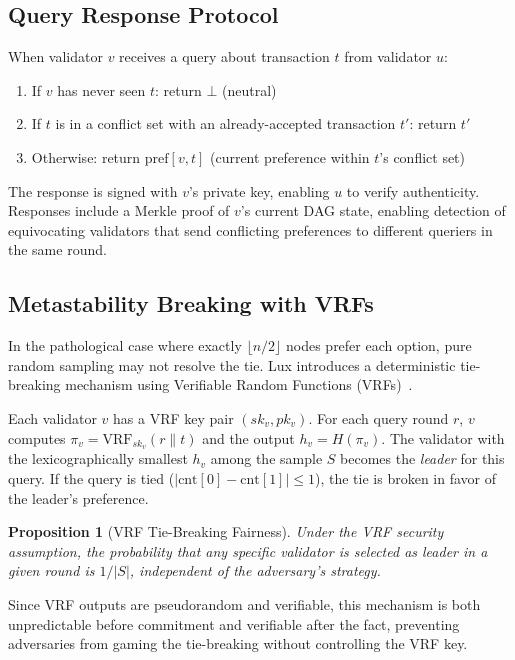 \documentclass[11pt,a4paper]{article}
\newtheorem{proposition}[theorem]{Proposition}
\begin{document}
\subsection{Query Response Protocol}

When validator $v$ receives a query about transaction $t$ from validator $u$:
\begin{enumerate}
\item If $v$ has never seen $t$: return $\bot$ (neutral)
\item If $t$ is in a conflict set with an already-accepted transaction $t'$: return $t'$
\item Otherwise: return $\text{pref}[v, t]$ (current preference within $t$'s conflict set)
\end{enumerate}

The response is signed with $v$'s private key, enabling $u$ to verify authenticity.
Responses include a Merkle proof of $v$'s current DAG state, enabling detection of
equivocating validators that send conflicting preferences to different queriers in the
same round.

\subsection{Metastability Breaking with VRFs}

In the pathological case where exactly $\lfloor n/2 \rfloor$ nodes prefer each option,
pure random sampling may not resolve the tie. Lux introduces a deterministic tie-breaking
mechanism using Verifiable Random Functions (VRFs)~\cite{micali1999verifiable}.

Each validator $v$ has a VRF key pair $(sk_v, pk_v)$. For each query round $r$, $v$
computes $\pi_v = \text{VRF}_{sk_v}(r \| t)$ and the output $h_v = H(\pi_v)$.
The validator with the lexicographically smallest $h_v$ among the sample $S$ becomes the
\emph{leader} for this query. If the query is tied ($|\text{cnt}[0] - \text{cnt}[1]| \leq 1$),
the tie is broken in favor of the leader's preference.

\begin{proposition}[VRF Tie-Breaking Fairness]
Under the VRF security assumption, the probability that any specific validator is
selected as leader in a given round is $1/|S|$, independent of the adversary's strategy.
\end{proposition}

Since VRF outputs are pseudorandom and verifiable, this mechanism is both unpredictable
before commitment and verifiable after the fact, preventing adversaries from gaming the
tie-breaking without controlling the VRF key.
\end{document}
